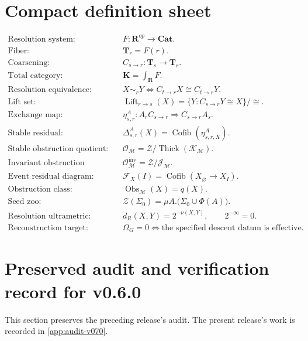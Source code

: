 \documentclass[11pt]{article}
\theoremstyle{definition}
\theoremstyle{remark}
\newcommand{\K}{\mathbf K}
\newcommand{\Rcat}{\mathbf R}
\newcommand{\Tcat}{\mathbf T}
\newcommand{\Cat}{\mathbf{Cat}}
\newcommand{\Lift}{\operatorname{Lift}}
\newcommand{\Cofib}{\operatorname{Cofib}}
\newcommand{\Obs}{\operatorname{Obs}}
\newcommand{\Zoo}{\mathcal Z}
\newcommand{\Seeds}{\Sigma}
\begin{document}
\appendix
\section{Compact definition sheet}

\begin{align*}
\text{Resolution system:}\quad
&F:\Rcat^{op}\to\Cat.\\[0.4em]
\text{Fiber:}\quad
&\Tcat_r=F(r).\\[0.4em]
\text{Coarsening:}\quad
&C_{s\to r}:\Tcat_s\to\Tcat_r.\\[0.4em]
\text{Total category:}\quad
&\K=\int_{\Rcat}F.\\[0.4em]
\text{Resolution equivalence:}\quad
&X\sim_rY\iff C_{t\to r}X\cong C_{t\to r}Y.\\[0.4em]
\text{Lift set:}\quad
&\Lift_{r\to s}(X)=\{Y:C_{s\to r}Y\cong X\}/\cong.\\[0.4em]
\text{Exchange map:}\quad
&\eta^A_{s,r}:A_rC_{s\to r}\Rightarrow C_{s\to r}A_s.\\[0.4em]
\text{Stable residual:}\quad
&\Delta^A_{s,r}(X)=\Cofib(\eta^A_{s,r,X}).\\[0.4em]
\text{Stable obstruction quotient:}\quad
&\mathcal O_{\mathscr M}=\mathcal Z/\operatorname{Thick}(\mathcal K_{\mathscr M}).\\[0.4em]
\text{Invariant obstruction quotient:}\quad
&\mathcal O^{\mathrm{inv}}_{\mathscr M}=\mathcal Z/\mathcal J_{\mathscr M}.\\[0.4em]
\text{Event residual diagram:}\quad
&\mathcal F_X(I)=\Cofib(X_{\varnothing}\to X_I).\\[0.4em]
\text{Obstruction class:}\quad
&\Obs_{\mathscr M}(X)=q(X).\\[0.4em]
\text{Seed zoo:}\quad
&\Zoo(\Seeds_0)=\mu A.\bigl(\Seeds_0\cup\Phi(A)\bigr).\\[0.4em]
\text{Resolution ultrametric:}\quad
&d_R(X,Y)=2^{-\nu(X,Y)},\qquad 2^{-\infty}=0.\\[0.4em]
\text{Reconstruction target:}\quad
&\Omega_G=0\iff\text{the specified descent datum is effective}.
\end{align*}


\section{Preserved audit and verification record for v0.6.0}\label{app:audit}

This section preserves the preceding release's audit. The present release's work is recorded in \cref{app:audit-v070}.
\end{document}
